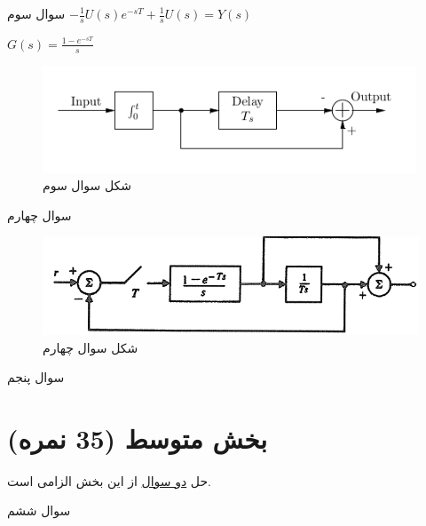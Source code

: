 \documentclass{article}
\begin{document}
    \begin{problem}{سوال سوم}
    	\raggedleft
    	$-\frac{1}{s}U(s)e^{-sT} + \frac{1}{s}U(s) = Y(s)$
    	
    	
    	$G(s) = \frac{1-e^{-sT}}{s}$ 
    	
    	
    \end{problem}
    \begin{figure}[htbp]
    	\centering
    	\includegraphics{Second Series/4.png}
    	\caption{شکل سوال سوم}
    \end{figure}
    
    
    \begin{problem}{سوال چهارم}
    	
    	
    \end{problem}
    \begin{figure}[htbp]
    	\includegraphics[width=\linewidth]{Second Series/5.png}
    	\caption{شکل سوال چهارم}
    \end{figure}
    
    \begin{problem}{سوال پنجم}
    	
    	
    \end{problem}
\raggedleft    
\section{بخش متوسط (35 نمره)}
\centering
حل \underline{دو سوال} از این بخش الزامی است.
\begin{problem}{سوال ششم}
	

\end{problem}
	
\end{document}

